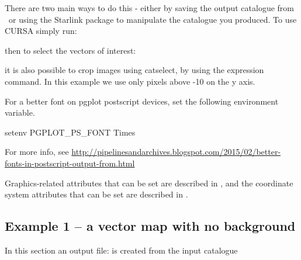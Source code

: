 There are two main ways to do this - either by saving the output
catalogue from \GAIA\ or using the Starlink package
 to manipulate
the catalogue you produced.  To use \textsc{CURSA} simply run:

\begin{terminalv}
\end{terminalv}

then to select the vectors of interest:

\begin{terminalv}
\end{terminalv}

it is also possible to crop images using catselect, by using the
expression command.  In this example we use only pixels above -10 on
the y axis.

\begin{terminalv}
\end{terminalv}




\begin{tip}
  For a better font on pgplot postscript devices, set the following
  environment variable.

\begin{terminalv}
setenv PGPLOT_PS_FONT Times
\end{terminalv}

For more info, see
\url{http://pipelinesandarchives.blogspot.com/2015/02/better-fonts-in-postscript-output-from.html}

Graphics-related attributes that can be set are described in
, and the coordinate system attributes that can be set are
described in .
\end{tip}





\subsection{ Example 1 -- a vector map with no background}
\label{section:kappa-example1}

In this section an output file:  is created from the input
catalogue 

